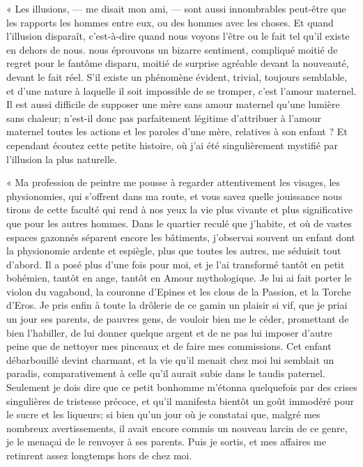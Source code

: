« Les illusions, --- me disait mon ami, --- sont aussi innombrables
peut{}-être que les rapports les hommes entre eux, ou des hommes avec
les choses. Et quand l’illusion disparaît,
c’est{}-à{}-dire quand nous voyons
l’être ou le fait tel qu’il existe en
dehors de nous. nous éprouvons un bizarre sentiment, compliqué moitié
de regret pour le fantôme disparu, moitié de surprise agréable devant
la nouveauté, devant le fait réel. S’il existe un
phénomène évident, trivial, toujours semblable, et
d’une nature à laquelle il soit impossible de se
tromper, c’est l’amour maternel. Il
est aussi difficile de supposer une mère sans amour maternel
qu’une lumière sans chaleur;
n’est{}-il donc pas parfaitement légitime
d’attribuer à l’amour maternel toutes
les actions et les paroles d’une mère, relatives à son
enfant ? Et cependant écoutez cette petite histoire, où
j’ai été singulièrement mystifié par
l’illusion la plus naturelle.

« Ma profession de peintre me pousse à regarder attentivement les
visages, les physionomies, qui s’offrent dans ma
route, et vous savez quelle jouissance nous tirons de cette faculté qui
rend à nos yeux la vie plus vivante et plus significative que pour les
autres hommes. Dans le quartier reculé que j’habite,
et où de vastes espaces gazonnés séparent encore les bâtiments,
j’observai souvent un enfant dont la physionomie
ardente et espiègle, plus que toutes les autres, me séduisit tout
d’abord. Il a posé plus d’une fois
pour moi, et je l’ai transformé tantôt en petit
bohémien, tantôt en ange, tantôt en Amour mythologique. Je lui ai fait
porter le violon du vagabond, la couronne d’Epines et
les clous de la Passion, et la Torche d’Eros. Je pris
enfin à toute la drôlerie de ce gamin un plaisir si vif, que je priai
un jour ses parents, de pauvres gens, de vouloir bien me le céder,
promettant de bien l’habiller, de lui donner quelque
argent et de ne pas lui imposer d’autre peine que de
nettoyer mes pinceaux et de faire mes commissions. Cet enfant
débarbouillé devint charmant, et la vie qu’il menait
chez moi lui semblait un paradis, comparativement à celle
qu’il aurait subie dans le taudis paternel. Seulement
je dois dire que ce petit bonhomme m’étonna
quelquefois par des crises singulières de tristesse précoce, et
qu’il manifesta bientôt un goût immodéré pour le sucre
et les liqueurs; si bien qu’un jour où je constatai
que, malgré mes nombreux avertissements, il avait encore commis un
nouveau larcin de ce genre, je le menaçai de le renvoyer à ses parents.
Puis je sortis, et mes affaires me retinrent assez longtemps hors de
chez moi.

